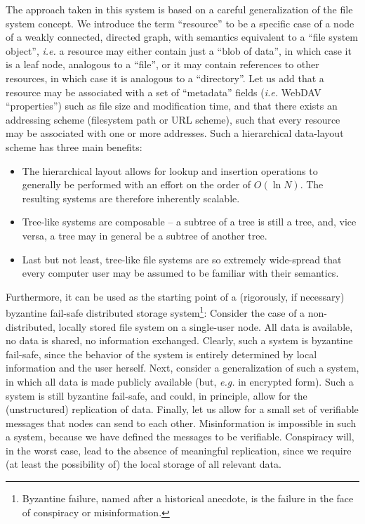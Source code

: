 \documentclass[11pt]{article}
\begin{document}
\begin{mainmatter}
The approach taken in this system is based on a careful generalization of the file system concept. 
We introduce the term ``resource'' to be a specific case of a node of a weakly connected, directed graph, with semantics equivalent to a ``file system object'', \emph{i.e.} a resource may either contain just a ``blob of data'', in which case it is a leaf node, analogous to a ``file'', or it may contain references to other resources, in which case it is analogous to a ``directory''. Let us add that a resource may be associated with a set of ``metadata'' fields (\emph{i.e.} WebDAV ``properties'') such as file size and modification time, and that there exists an addressing scheme (filesystem path or URL scheme), such that every resource may be associated with one or more addresses. Such a hierarchical data-layout scheme has three main benefits:
\begin{itemize}
\item The hierarchical layout allows for lookup and insertion operations to generally be performed with an effort on the order of $O(\ln N)$. The resulting systems are therefore inherently scalable.
\item Tree-like systems are composable -- a subtree of a tree is still a tree, and, vice versa, a tree may in general be a subtree of another tree.
\item Last but not least, tree-like file systems are so extremely wide-spread that every computer user may be assumed to be familiar with their semantics.
\end{itemize}

Furthermore, it can be used as the starting point of a (rigorously, if necessary) byzantine fail-safe distributed storage system\footnote{Byzantine failure, named after a historical anecdote, is the failure in the face of conspiracy or misinformation.}: Consider the case of a non-distributed, locally stored file system on a single-user node. All data is available, no data is shared, no information exchanged. Clearly, such a system is byzantine fail-safe, since the behavior of the system is entirely determined by local information and the user herself. Next, consider a generalization of such a system, in which all data is made publicly  available (but, \emph{e.g.} in encrypted form). Such a system is still byzantine fail-safe, and could, in principle, allow for the (unstructured) replication of data. Finally, let us allow for a small set of verifiable messages that nodes can send to each other. Misinformation is impossible in such a system, because we have defined the messages to be verifiable. Conspiracy will, in the worst case, lead to the absence of meaningful replication, since we require (at least the possibility of) the local storage of all relevant data.


\end{mainmatter}
\end{document}
